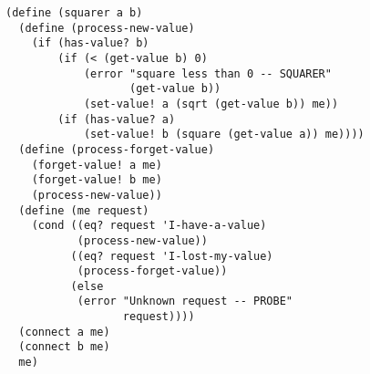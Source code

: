 \documentclass[a4paper,12pt]{article}
\begin{document}
\begin{lstlisting}
(define (squarer a b)
  (define (process-new-value)
    (if (has-value? b)
        (if (< (get-value b) 0)
            (error "square less than 0 -- SQUARER"
                   (get-value b))
            (set-value! a (sqrt (get-value b)) me))
        (if (has-value? a)
            (set-value! b (square (get-value a)) me))))
  (define (process-forget-value)
    (forget-value! a me)
    (forget-value! b me)
    (process-new-value))
  (define (me request)
    (cond ((eq? request 'I-have-a-value)
           (process-new-value))
          ((eq? request 'I-lost-my-value)
           (process-forget-value))
          (else
           (error "Unknown request -- PROBE"
                  request))))
  (connect a me)
  (connect b me)
  me)
\end{lstlisting}
\end{document}

